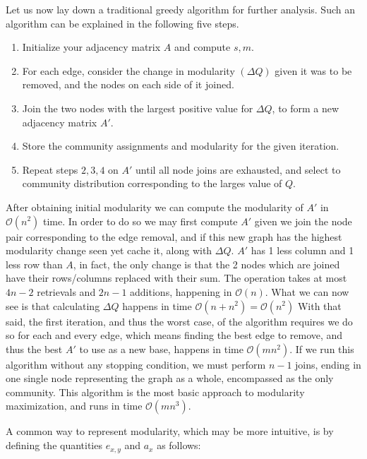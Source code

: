 \documentclass[a4paper, 10pt, twocolumn]{article}
\begin{document}
Let us now lay down a traditional greedy algorithm for further analysis. 
Such an algorithm can be explained in the following five steps. 

\begin{enumerate}
       \item Initialize your adjacency matrix $ A $ and compute $ s, m $.
       \item For each edge, consider the change in modularity $ (\Delta Q) $ given it was to be removed, and the nodes on each side of it joined. 
       \item Join the two nodes with the largest positive value for $ \Delta Q $, to form a new adjacency matrix $ A' $.
       \item Store the community assignments and modularity for the given iteration.
       \item Repeat steps $ 2,3,4 $ on $ A' $ until all node joins are exhausted, and select to community distribution corresponding to the larges value of $ Q $.
\end{enumerate}

\noindent
After obtaining initial modularity we can compute the modularity of $ A' $ in $ \mathcal{O}(n^{2}) $ time. In order to do so we may first compute $ A' $ given we join the node pair corresponding to the edge removal, and if this new graph has the highest modularity change seen yet cache it, along with $ \Delta Q $. 
$ A' $ has 1 less column and 1 less row than $ A $, in fact, the only change is that the 2 nodes which are joined have their rows/columns replaced with their sum. 
The operation takes at most $ 4n -2 $ retrievals and $ 2n - 1 $ additions, happening in $ \mathcal{O}(n) $. 
What we can now see is that calculating $ \Delta Q $ happens in time $ \mathcal{O}(n + n^{2}) = \mathcal{O}(n^{2})$
With that said, the first iteration, and thus the worst case, of the algorithm requires we do so for each and every edge, which means finding the best edge to remove, and thus the best $ A' $ to use as a new base, happens in time $ \mathcal{O}(mn^{2}) $.
If we run this algorithm without any stopping condition, we must perform $ n - 1 $ joins, ending in one single node representing the graph as a whole, encompassed as the only community. 
This algorithm is the most basic approach to modularity maximization, and runs in time $ \mathcal{O}(mn^{3}) $.

A common way to represent modularity, which may be more intuitive, is by defining the quantities $ e_{x, y} $ and $ a_{x} $ as follows:
\end{document}
